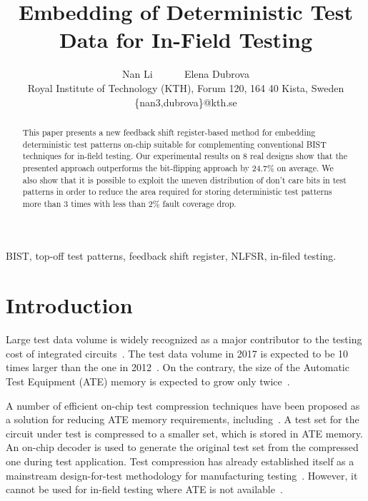 \documentclass[10pt,conference]{IEEEtran}
\begin{document}
\title{Embedding of Deterministic Test Data for In-Field Testing}
\author{Nan Li ~~~~~ Elena Dubrova \\
Royal Institute of Technology (KTH), Forum 120, 164 40 Kista, Sweden\\
\{nan3,dubrova\}@kth.se
}

\maketitle

\begin{abstract}
This paper presents a new feedback shift register-based method for embedding deterministic test patterns
on-chip suitable for complementing conventional BIST techniques for in-field 
testing. Our experimental results on 8 real designs show that the presented 
approach outperforms the bit-flipping approach by 24.7\% on average.
We also show that it is possible to exploit the uneven distribution of 
don't care bits in test patterns in order to reduce the area required for 
storing deterministic test patterns more than 3 times with less than 2\% 
fault coverage drop.
\end{abstract}


\begin{keywords}
BIST, top-off test patterns, feedback shift register, NLFSR, in-filed testing.
\end{keywords}

\section{Introduction}

Large test data volume is widely recognized 
as a major contributor to the testing cost of integrated circuits~\cite{WaC05}.
The test data volume in 2017 is expected to be 10 times larger
than the one in 2012~\cite{ITRS}. On the contrary, the size of the Automatic Test 
Equipment (ATE) memory is expected to grow only twice~\cite{ITRS}.

A number of efficient on-chip test compression techniques have been proposed
as a solution for reducing ATE memory requirements, including~\cite{WaC05,KoB01,RaTKM04,MiK04,CzM11}. 
A test set for the circuit under test is 
compressed to a smaller set, which is stored in ATE memory. An on-chip decoder is used to generate the original test set from the compressed one during test application.
Test compression has already established itself as a mainstream design-for-test
methodology for manufacturing testing~\cite{CzM11}. 
However, it cannot be used for in-field testing where ATE is not available~\cite{MaA10}.
\end{document}
